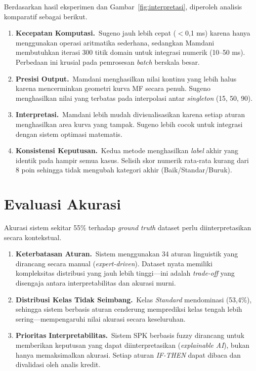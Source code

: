\documentclass[12pt,a4paper]{report}
\begin{document}
Berdasarkan hasil eksperimen dan Gambar~\ref{fig:interpretasi},
diperoleh analisis komparatif sebagai berikut.

\begin{enumerate}[label=\arabic*.]
  \item \textbf{Kecepatan Komputasi.}\ Sugeno jauh lebih cepat
        ($<$0{,}1 ms) karena hanya menggunakan operasi
        aritmatika sederhana, sedangkan Mamdani membutuhkan
        iterasi 300 titik domain untuk integrasi numerik
        (10--50 ms). Perbedaan ini krusial pada pemrosesan
        \textit{batch} berskala besar.

  \item \textbf{Presisi Output.}\ Mamdani menghasilkan nilai
        kontinu yang lebih halus karena mencerminkan geometri
        kurva MF secara penuh. Sugeno menghasilkan nilai yang
        terbatas pada interpolasi antar \textit{singleton}
        (15, 50, 90).

  \item \textbf{Interpretasi.}\ Mamdani lebih mudah
        divisualisasikan karena setiap aturan menghasilkan
        area kurva yang tampak. Sugeno lebih cocok untuk
        integrasi dengan sistem optimasi matematis.

  \item \textbf{Konsistensi Keputusan.}\ Kedua metode
        menghasilkan \textit{label} akhir yang identik pada
        hampir semua kasus. Selisih skor numerik rata-rata
        kurang dari 8 poin sehingga tidak mengubah kategori
        akhir (Baik/Standar/Buruk).
\end{enumerate}

\section{Evaluasi Akurasi}

Akurasi sistem sekitar 55\% terhadap \textit{ground truth}
dataset perlu diinterpretasikan secara kontekstual.

\begin{enumerate}[label=\arabic*.]
  \item \textbf{Keterbatasan Aturan.}\ Sistem menggunakan 34
        aturan linguistik yang dirancang secara manual
        (\textit{expert-driven}). Dataset nyata memiliki
        kompleksitas distribusi yang jauh lebih tinggi—ini
        adalah \textit{trade-off} yang disengaja antara
        interpretabilitas dan akurasi murni.

  \item \textbf{Distribusi Kelas Tidak Seimbang.}\ Kelas
        \textit{Standard} mendominasi (53,4\%), sehingga
        sistem berbasis aturan cenderung memprediksi kelas
        tengah lebih sering—mempengaruhi nilai akurasi secara
        keseluruhan.

  \item \textbf{Prioritas Interpretabilitas.}\ Sistem SPK
        berbasis fuzzy dirancang untuk memberikan keputusan
        yang dapat diinterpretasikan (\textit{explainable
        AI}), bukan hanya memaksimalkan akurasi. Setiap
        aturan \textit{IF-THEN} dapat dibaca dan divalidasi
        oleh analis kredit.
\end{enumerate}
\end{document}
